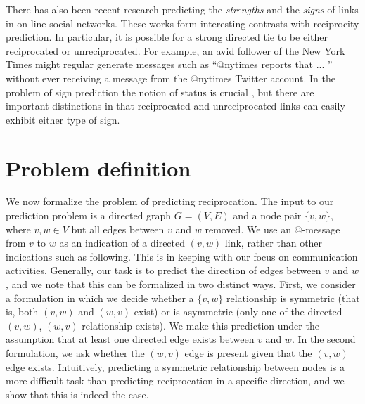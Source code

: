 \documentclass[conference]{IEEEtran}
\begin{document}
There has also been recent research predicting the 
{\em strengths} \cite{gilbert-tie-strength} and the 
{\em signs} \cite{leskovec-chi10} of links in on-line social networks.
These works form interesting contrasts with reciprocity prediction.
In particular, it is possible for a strong directed tie to be
either reciprocated or unreciprocated.  For example, an avid
follower of the New York Times might regular generate messages
such as ``@nytimes reports that ... '' without
ever receiving a message from the @nytimes Twitter account.
In the problem of sign prediction the
notion of status is crucial \cite{leskovec-chi10},
but there are important distinctions in that reciprocated and
unreciprocated links can easily exhibit either type of sign.

\section{Problem definition}

We now formalize the problem of predicting reciprocation.
The input to our prediction problem is a directed graph $G=(V,E)$ and a node pair $\{v,w\}$, where $v,w \in V$ but all edges between $v$ and $w$ removed. 
We use an @-message from $v$ to $w$ as an indication of a directed
$(v,w)$ link, rather than other indications such as following.
This is in keeping with our focus 
on communication activities.
Generally, our task
is to predict the direction of edges between $v$ and $w$, and we note
that this can be formalized in two distinct ways.
First, we consider a formulation in which we decide whether a $\{v,w\}$ relationship is symmetric (that is, both $(v,w)$ and $(w,v)$ exist) or is asymmetric (only one of the directed $(v,w)$, $(w,v)$ relationship exists).
We make this prediction under the assumption that at least one directed edge exists between $v$ and $w$. 
In the second formulation, we ask whether the $(w,v)$ edge is present given that the 
$(v,w)$ edge exists.
Intuitively, predicting a symmetric relationship
between nodes is a more difficult task than predicting reciprocation
in a specific direction, and we show that this is indeed the case.
\end{document}
